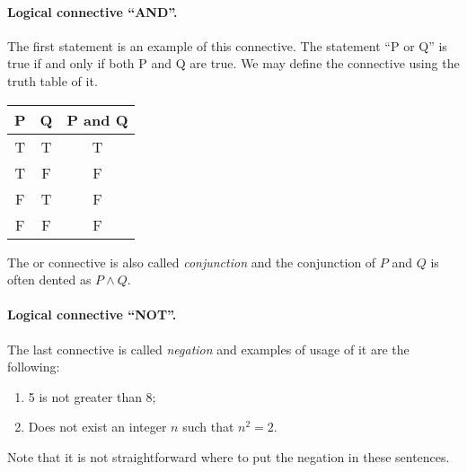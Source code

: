 \paragraph{Logical connective ``AND''.}
The first statement is an example of this connective. The statement ``P or Q''
is true if and only if both P and Q are true. We may define the
connective using the truth table of it.
\begin{center}
  \begin{tabular}{c | c | c}
    P & Q & P and Q \\
    \hline
    T & T & T \\
    T & F & F \\
    F & T & F \\
    F & F & F
  \end{tabular}
\end{center}

The or connective is also called \textit{conjunction} and the conjunction of
$P$ and $Q$ is often dented as $P \land Q$.

\paragraph{Logical connective ``NOT''.}
The last connective is called \textit{negation} and examples of usage of it are
the following:
\begin{enumerate}
  \item 5 is not greater than 8;
  \item Does not exist an integer $n$ such that $n^2 = 2$.
\end{enumerate}

Note that it is not straightforward where to put the negation in these
sentences.
